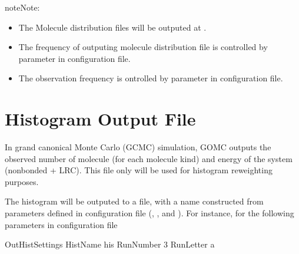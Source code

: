 \documentclass[letterpaper,10pt,english]{sphinxmanual}
\begin{document}
\begin{sphinxadmonition}{note}{Note:}\begin{itemize}
\item {} 
The Molecule distribution files will be outputed at .

\item {} 
The frequency of outputing molecule distribution file is controlled by 
parameter in configuration file.

\item {} 
The observation frequency is ontrolled by  parameter in configuration file.

\end{itemize}
\end{sphinxadmonition}


\section{Histogram Output File}
\label{\detokenize{output_file:histogram-output-file}}
In grand canonical Monte Carlo (GCMC) simulation, GOMC outputs the observed number of molecule (for each
molecule kind) and energy of the system (nonbonded + LRC). This file only will be used for histogram
reweighting purposes.

The histogram will be outputed to a file, with a name constructed from parameters defined
in configuration file (, , and ). For instance, for
the following parameters in configuration file

\begin{sphinxVerbatim}[commandchars=\\\{\}]
\PYGZsh{}\PYGZsh{}\PYGZsh{}\PYGZsh{}\PYGZsh{}\PYGZsh{}\PYGZsh{}\PYGZsh{}\PYGZsh{}\PYGZsh{}\PYGZsh{}\PYGZsh{}\PYGZsh{}\PYGZsh{}\PYGZsh{}\PYGZsh{}\PYGZsh{}\PYGZsh{}\PYGZsh{}\PYGZsh{}\PYGZsh{}\PYGZsh{}\PYGZsh{}\PYGZsh{}\PYGZsh{}\PYGZsh{}\PYGZsh{}\PYGZsh{}\PYGZsh{}\PYGZsh{}\PYGZsh{}\PYGZsh{}\PYGZsh{}
\PYGZsh{} OutHistSettings
\PYGZsh{}\PYGZsh{}\PYGZsh{}\PYGZsh{}\PYGZsh{}\PYGZsh{}\PYGZsh{}\PYGZsh{}\PYGZsh{}\PYGZsh{}\PYGZsh{}\PYGZsh{}\PYGZsh{}\PYGZsh{}\PYGZsh{}\PYGZsh{}\PYGZsh{}\PYGZsh{}\PYGZsh{}\PYGZsh{}\PYGZsh{}\PYGZsh{}\PYGZsh{}\PYGZsh{}\PYGZsh{}\PYGZsh{}\PYGZsh{}\PYGZsh{}\PYGZsh{}\PYGZsh{}\PYGZsh{}\PYGZsh{}\PYGZsh{}
HistName   his
RunNumber  3
RunLetter  a
\end{sphinxVerbatim}
\end{document}
